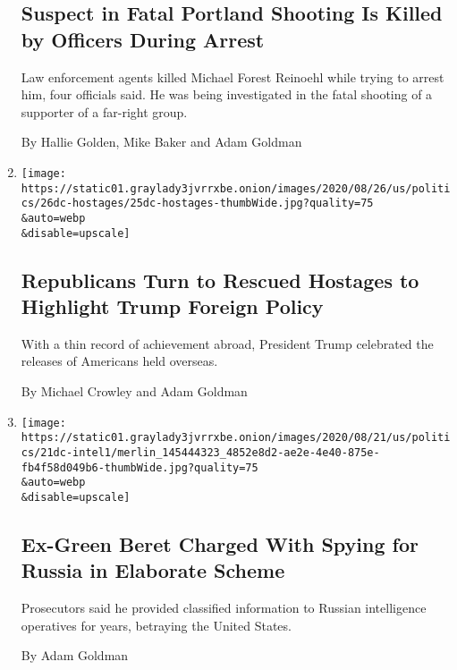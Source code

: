 \begin{enumerate}
  \hypertarget{suspect-in-fatal-portland-shooting-is-killed-by-officers-during-arrest}{%
  \subsection{Suspect in Fatal Portland Shooting Is Killed by Officers
  During
  Arrest}\label{suspect-in-fatal-portland-shooting-is-killed-by-officers-during-arrest}}

  Law enforcement agents killed Michael Forest Reinoehl while trying to
  arrest him, four officials said. He was being investigated in the
  fatal shooting of a supporter of a far-right group.

  By Hallie Golden, Mike Baker and Adam Goldman
\item
  \href{/2020/08/25/us/politics/trump-hostages.html}{}

  \texttt{[image: https://static01.graylady3jvrrxbe.onion/images/2020/08/26/us/politics/26dc-hostages/25dc-hostages-thumbWide.jpg?quality=75\\\&auto=webp\\\&disable=upscale]}

  \hypertarget{republicans-turn-to-rescued-hostages-to-highlight-trump-foreign-policy}{%
  \subsection{Republicans Turn to Rescued Hostages to Highlight Trump
  Foreign
  Policy}\label{republicans-turn-to-rescued-hostages-to-highlight-trump-foreign-policy}}

  With a thin record of achievement abroad, President Trump celebrated
  the releases of Americans held overseas.

  By Michael Crowley and Adam Goldman
\item
  \href{/2020/08/21/us/politics/peter-debbins-russia-spying.html}{}

  \texttt{[image: https://static01.graylady3jvrrxbe.onion/images/2020/08/21/us/politics/21dc-intel1/merlin\_145444323\_4852e8d2-ae2e-4e40-875e-fb4f58d049b6-thumbWide.jpg?quality=75\\\&auto=webp\\\&disable=upscale]}

  \hypertarget{ex-green-beret-charged-with-spying-for-russia-in-elaborate-scheme}{%
  \subsection{Ex-Green Beret Charged With Spying for Russia in Elaborate
  Scheme}\label{ex-green-beret-charged-with-spying-for-russia-in-elaborate-scheme}}

  Prosecutors said he provided classified information to Russian
  intelligence operatives for years, betraying the United States.

  By Adam Goldman
\end{enumerate}

